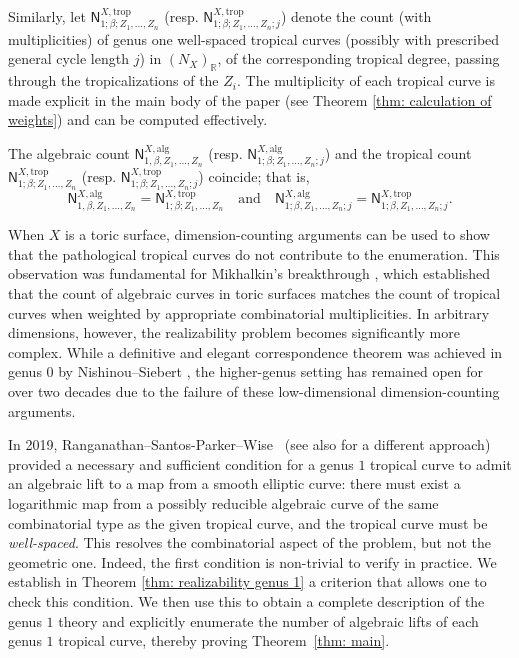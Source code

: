 \documentclass{article}
\def\R{\mathbb{R}}
\newenvironment{customthm}[1]
{\renewcommand\theinnercustomthm{#1}\innercustomthm}
{\endinnercustomthm}
\begin{document}
Similarly, let $\mathsf{N}^{X,\mathrm{trop}}_{1;\beta;Z_1,\ldots,Z_n}$ (resp. $\mathsf{N}^{X,\mathrm{trop}}_{1;\beta;Z_1,\ldots,Z_n;j}$) denote the count (with multiplicities) of genus one well-spaced tropical curves (possibly with prescribed general cycle length $j$) in $(N_X)_\R$, of the corresponding tropical degree, passing through the tropicalizations of the $Z_i$. The multiplicity of each tropical curve is made explicit in the main body of the paper (see Theorem \ref{thm: calculation of weights}) and can be computed effectively. 


\begin{customthm}{A}\label{thm: main}
The algebraic count
$\mathsf{N}^{X,\mathrm{alg}}_{1,\beta,Z_1,\ldots,Z_n}$
(resp. $\mathsf{N}^{X,\mathrm{alg}}_{1;\beta;Z_1,\ldots,Z_n;j}$)
and the tropical count
$\mathsf{N}^{X,\mathrm{trop}}_{1;\beta;Z_1,\ldots,Z_n}$
(resp. $\mathsf{N}^{X,\mathrm{trop}}_{1;\beta;Z_1,\ldots,Z_n;j}$)
coincide; that is,
\[
\mathsf{N}^{X,\mathrm{alg}}_{1,\beta,Z_1,\ldots,Z_n}
=
\mathsf{N}^{X,\mathrm{trop}}_{1;\beta;Z_1,\ldots,Z_n}
\quad \text{and} \quad
\mathsf{N}^{X,\mathrm{alg}}_{1;\beta,Z_1,\ldots,Z_n;j}
=
\mathsf{N}^{X,\mathrm{trop}}_{1;\beta,Z_1,\ldots,Z_n;j}.
\]
\end{customthm}



When $X$ is a toric surface, dimension-counting arguments can be used to show that the pathological tropical curves do not contribute to the enumeration. This observation was fundamental for Mikhalkin's breakthrough \cite{Mik05}, which established that the count of algebraic curves in toric surfaces matches the count of tropical curves when weighted by appropriate combinatorial multiplicities. In arbitrary dimensions, however, the realizability problem becomes significantly more complex. While a definitive and elegant correspondence theorem was achieved in genus 0 by Nishinou–Siebert \cite{NS06}, the higher-genus setting has remained open for over two decades due to the failure of these low-dimensional dimension-counting arguments.

In 2019, Ranganathan--Santos-Parker--Wise~\cite{RSWI, RSWII} (see also \cite{LNR} for a different approach) provided a necessary and sufficient condition for a genus $1$ tropical curve to admit an algebraic lift to a map from a smooth elliptic curve: there must exist a logarithmic map from a possibly reducible algebraic curve of the same combinatorial type as the given tropical curve, and the tropical curve must be \emph{well-spaced}. This resolves the combinatorial aspect of the problem, but not the geometric one. Indeed, the first condition is non-trivial to verify in practice. We establish in Theorem \ref{thm: realizability genus 1} a criterion that allows one to check this condition. We then use this to obtain a complete description of the genus $1$ theory and explicitly enumerate the number of algebraic lifts of each genus $1$ tropical curve, thereby proving Theorem~\ref{thm: main}.
\end{document}
